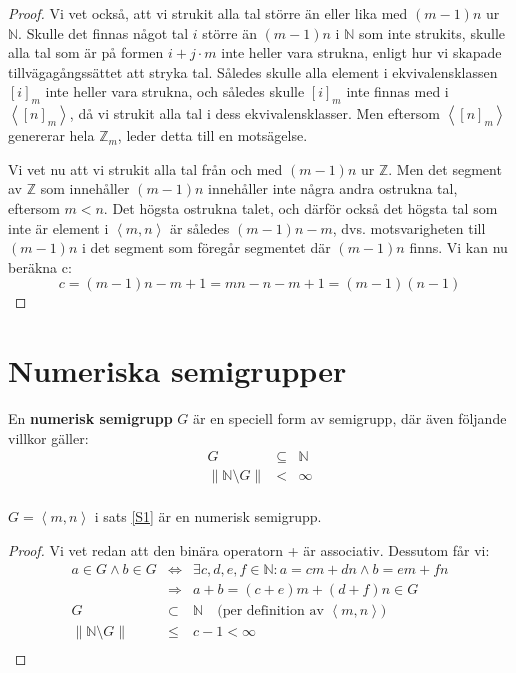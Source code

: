 \begin{proof}
Vi vet också, att vi strukit alla tal större än eller lika med $(m-1)n$ ur $\mathbb{N}$. Skulle det finnas något tal $i$ större än  $(m-1)n$ i $\mathbb{N}$ som inte strukits, skulle alla tal som är på formen $i+j\cdot m$ inte heller vara strukna, enligt hur vi skapade tillvägagångssättet att stryka tal. Således skulle alla element i ekvivalensklassen $[i]_m$ inte heller vara strukna, och således skulle $[i]_m$ inte finnas med i $\left<[n]_m\right>$, då vi strukit alla tal i dess ekvivalensklasser. Men eftersom $\left<[n]_m\right>$ genererar hela $\mathbb{Z}_m$, leder detta till en motsägelse.

Vi vet nu att vi strukit alla tal från och med $(m-1)n$ ur $\mathbb{Z}$. Men det segment av $\mathbb{Z}$ som innehåller $(m-1)n$ innehåller inte några andra ostrukna tal, eftersom $m < n$. Det högsta ostrukna talet, och därför också det högsta tal som inte är element i $\left<m, n\right>$ är således $(m - 1)n - m$, dvs. motsvarigheten till $(m - 1)n$ i det segment som föregår segmentet där $(m - 1)n$ finns. Vi kan nu beräkna c:
\[c = (m - 1)n - m + 1 = mn - n - m + 1 = (m - 1)(n - 1)\]
\end{proof}

\section{Numeriska semigrupper}

\begin{Definition}
En \textbf{numerisk semigrupp} $G$ är en speciell form av semigrupp, där även följande villkor gäller:
\[
\begin{array}{rcl}
G & \subseteq & \mathbb{N} \\
\left\| \mathbb{N} \setminus G \right\| & < & \infty \\
\end{array}\]
\end{Definition}

\begin{Lemma}
$G = \left<m, n\right>$ i sats \ref{S1} är en numerisk semigrupp.
\end{Lemma}

\begin{proof}
Vi vet redan att den binära operatorn + är associativ. Dessutom får vi:
\[\begin{array}{rcl}
a \in G \wedge b \in G & \Longleftrightarrow & \exists c, d, e, f \in \mathbb{N} : a = cm + dn \wedge b = em + fn \\
 & \Longrightarrow & a + b = (c + e)m + (d + f)n \in G \\
G & \subset & \mathbb{N} \quad\text{(per definition av } \left<m, n\right> \text{)} \\
\left\|\mathbb{N}\setminus G\right\| & \leq & c - 1 < \infty \\
\end{array}\]
\end{proof}

